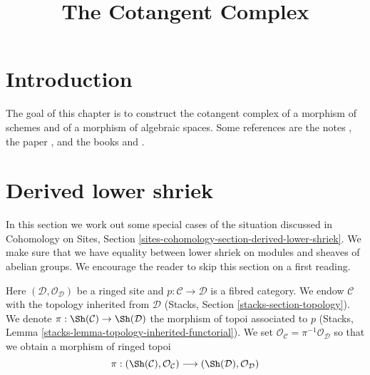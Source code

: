 

%


\title{The Cotangent Complex}


\maketitle

\label{section-phantom}

\tableofcontents

\section{Introduction}
\label{section-introduction}

\noindent
The goal of this chapter is to construct the cotangent complex of a
morphism of schemes and of a morphism of algebraic spaces.
Some references are the notes \cite{quillenhomology}, the paper
\cite{quillencohomology}, and the books
\cite{Andre} and \cite{cotangent}.





\section{Derived lower shriek}
\label{section-derived-lower-shriek}

\noindent
In this section we work out some special cases of the situation
discussed in Cohomology on Sites, Section
\ref{sites-cohomology-section-derived-lower-shriek}.
We make sure that we have equality between lower shriek on modules
and sheaves of abelian groups. We encourage the reader to skip
this section on a first reading.

\begin{situation}
\label{situation-fibred-category}
Here $(\mathcal{D}, \mathcal{O}_\mathcal{D})$ be a ringed site
and $p : \mathcal{C} \to \mathcal{D}$ is a fibred category. We endow
$\mathcal{C}$ with the topology inherited from $\mathcal{D}$
(Stacks, Section \ref{stacks-section-topology}). We denote
$\pi : \Sh(\mathcal{C}) \to \Sh(\mathcal{D})$ the morphism of
topoi associated to $p$
(Stacks, Lemma \ref{stacks-lemma-topology-inherited-functorial}).
We set $\mathcal{O}_\mathcal{C} = \pi^{-1}\mathcal{O}_\mathcal{D}$
so that we obtain a morphism of ringed topoi
$$
\pi :
(\Sh(\mathcal{C}), \mathcal{O}_\mathcal{C})
\longrightarrow
(\Sh(\mathcal{D}), \mathcal{O}_\mathcal{D})
$$
\end{situation}


